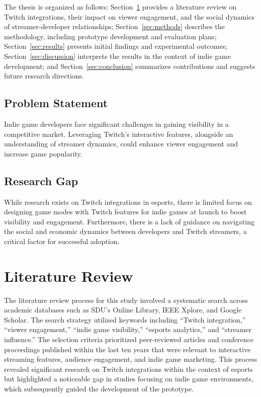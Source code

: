 \documentclass[conference]{IEEEtran}
\begin{document}
The thesis is organized as follows: Section~\ref{sec:lit} provides a literature review on Twitch integrations, their impact on viewer engagement, and the social dynamics of streamer-developer relationships; Section~\ref{sec:methods} describes the methodology, including prototype development and evaluation plans; Section~\ref{sec:results} presents initial findings and experimental outcomes; Section~\ref{sec:discussion} interprets the results in the context of indie game development; and Section~\ref{sec:conclusion} summarizes contributions and suggests future research directions.

\subsection{Problem Statement}
Indie game developers face significant challenges in gaining visibility in a competitive market. Leveraging Twitch's interactive features, alongside an understanding of streamer dynamics, could enhance viewer engagement and increase game popularity.

\subsection{Research Gap}
While research exists on Twitch integrations in esports, there is limited focus on designing game modes with Twitch features for indie games at launch to boost visibility and engagement. Furthermore, there is a lack of guidance on navigating the social and economic dynamics between developers and Twitch streamers, a critical factor for successful adoption.

\section{Literature Review}\label{sec:lit}

The literature review process for this study involved a systematic search across academic databases such as SDU's Online Library, IEEE Xplore, and Google Scholar. The search strategy utilized keywords including ``Twitch integration,'' ``viewer engagement,'' ``indie game visibility,'' ``esports analytics,'' and ``streamer influence.'' The selection criteria prioritized peer-reviewed articles and conference proceedings published within the last ten years that were relevant to interactive streaming features, audience engagement, and indie game marketing. This process revealed significant research on Twitch integrations within the context of esports but highlighted a noticeable gap in studies focusing on indie game environments, which subsequently guided the development of the prototype.
\end{document}
